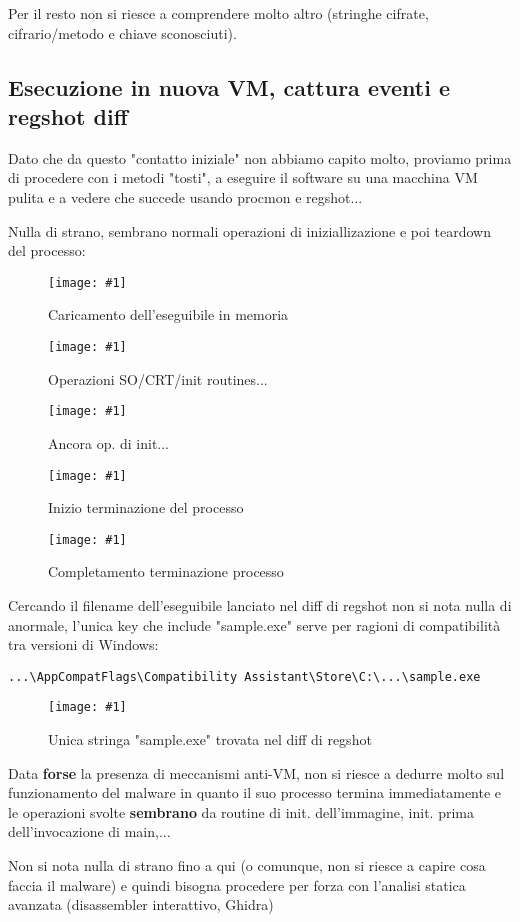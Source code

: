 \documentclass[
    a4paper, %
    11pt %
]{article}
\newcommand{\pic}[4]{\begin{figure}[H]
            \centering
            \texttt{[image: \#1]}
            \caption{#2}
            \label{fig:#1}
            \end{figure}}
\begin{document}
            Per il resto non si riesce a comprendere molto altro (stringhe cifrate, cifrario/metodo e
            chiave sconosciuti).

        \subsection{Esecuzione in nuova VM, cattura eventi e regshot diff}
            Dato che da questo "contatto iniziale" non abbiamo capito molto, proviamo prima di
            procedere con i metodi "tosti", a eseguire il software su una macchina VM pulita e 
            a vedere che succede usando procmon e regshot...

            Nulla di strano, sembrano normali operazioni di iniziallizazione e poi teardown del processo:
            \pic{procmon_load}{Caricamento dell'eseguibile in memoria}{12cm}{5cm}
            \pic{procmon_furtherload}{Operazioni SO/CRT/init routines...}{10cm}{5cm}
            \pic{procmon_furtherload2}{Ancora op. di init...}{10cm}{7cm}
            \pic{procmon_cleanup}{Inizio terminazione del processo}{10cm}{3cm}
            \pic{procmon_lastcleanup}{Completamento terminazione processo}{18cm}{5cm}

            Cercando il filename dell'eseguibile lanciato nel diff di regshot non si nota
            nulla di anormale, l'unica key che include "sample.exe" serve per ragioni di
            compatibilità tra versioni di Windows:
            
            \texttt{...\textbackslash AppCompatFlags\textbackslash Compatibility 
            Assistant\textbackslash Store\textbackslash  C:\textbackslash...\textbackslash sample.exe}
            \pic{regshot_sampleexe}{Unica stringa "sample.exe" trovata nel diff di regshot}{14cm}{6cm}

            Data \textbf{forse} la presenza di meccanismi anti-VM, non si riesce a dedurre molto sul
            funzionamento del malware in quanto il suo processo termina immediatamente e le operazioni
            svolte \textbf{sembrano} da routine di init. dell'immagine, init. prima dell'invocazione di 
            main,... 
            
            Non si nota nulla di strano fino a qui (o comunque, non si riesce a capire cosa faccia il 
            malware) e quindi bisogna procedere per forza con l'analisi
            statica avanzata (disassembler interattivo, Ghidra)
\end{document}
